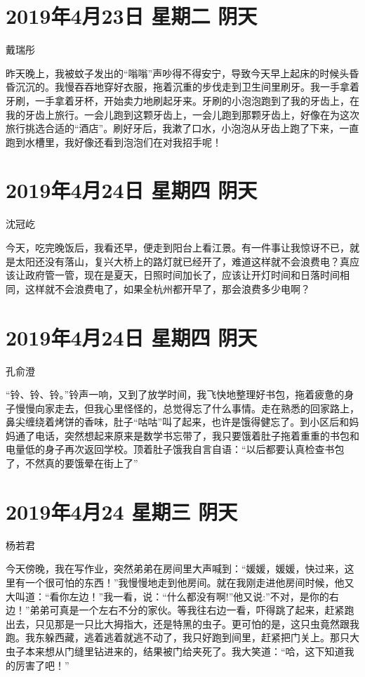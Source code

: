 \section{2019年4月23日 星期二 阴天}

戴瑞彤

昨天晚上，我被蚊子发出的``嗡嗡''声吵得不得安宁，导致今天早上起床的时候头昏昏沉沉的。我慢吞吞地穿好衣服，拖着沉重的步伐走到卫生间里刷牙。我一手拿着牙刷，一手拿着牙杯，开始卖力地刷起牙来。牙刷的小泡泡跑到了我的牙齿上，在我的牙齿上旅行。一会儿跑到这颗牙齿上，一会儿跑到那颗牙齿上，好像在为这次旅行挑选合适的``酒店''。刷好牙后，我漱了口水，小泡泡从牙齿上跑了下来，一直跑到水槽里，我好像还看到泡泡们在对我招手呢！

\section{2019年4月24日 星期四 阴天}

沈冠屹

今天，吃完晚饭后，我看还早，便走到阳台上看江景。有一件事让我惊讶不已，就是太阳还没有落山，复兴大桥上的路灯就已经开了，难道这样就不会浪费电？真应该让政府管一管，现在是夏天，日照时间加长了，应该让开灯时间和日落时间相同，这样就不会浪费电了，如果全杭州都开早了，那会浪费多少电啊？

\section{2019年4月24日 星期四 阴天}

孔俞澄

``铃、铃、铃。''铃声一响，又到了放学时间，我飞快地整理好书包，拖着疲惫的身子慢慢向家走去，但我心里怪怪的，总觉得忘了什么事情。走在熟悉的回家路上，鼻尖缠绕着烤饼的香味，肚子``咕咕''叫了起来，也许是饿得健忘了。到小区后和妈妈通了电话，突然想起来原来是数学书忘带了，我只要饿着肚子拖着重重的书包和电量低的身子再次返回学校。顶着肚子饿我自言自语：``以后都要认真检查书包了，不然真的要饿晕在街上了''

\section{2019年4月24 星期三 阴天}

杨若君

今天傍晚，我在写作业，突然弟弟在房间里大声喊到：``媛媛，媛媛，快过来，这里有一个很可怕的东西！''我慢慢地走到他房间。就在我刚走进他房间时候，他又大叫道：``看你左边！''我一看，说：``什么都没有啊!''他又说:''不对，是你的右边！''弟弟可真是一个左右不分的家伙。等我往右边一看，吓得跳了起来，赶紧跑出去，只见那是一只比大拇指大，还是特黑的虫子。更可怕的是，这只虫竟然跟我跑。我东躲西藏，逃着逃着就逃不动了，我只好跑到间里，赶紧把门关上。那只大虫子本来想从门缝里钻进来的，结果被门给夹死了。我大笑道：``哈，这下知道我的厉害了吧！''

